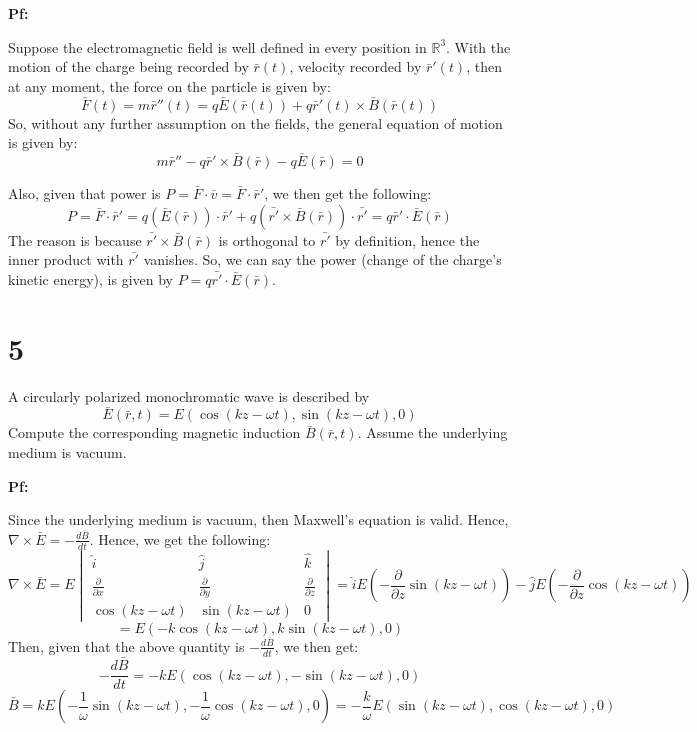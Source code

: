 \documentclass{article}
\begin{document}
\textbf{Pf:}

Suppose the electromagnetic field is well defined in every position in $\mathbb{R}^3$. With the motion of the charge being recorded by $\bar{r}(t)$,
velocity recorded by $\bar{r}'(t)$, then at any moment, the force on the particle is given by:
$$\bar{F}(t) = m\bar{r}''(t)=q\bar{E}(\bar{r}(t))+q\bar{r}'(t)\times \bar{B}(\bar{r}(t))$$
So, without any further assumption on the fields, the general equation of motion is given by:
$$m\bar{r}''-q\bar{r}'\times \bar{B}(\bar{r})-q\bar{E}(\bar{r}) = 0$$

\hfil

Also, given that power is $P=\bar{F}\cdot \bar{v} = \bar{F}\cdot \bar{r}'$, we then get the following:
$$P=\bar{F}\cdot \bar{r}' = q(\bar{E}(\bar{r}))\cdot \bar{r}' + q(\bar{r'}\times \bar{B}(\bar{r}))\cdot \bar{r'} = q\bar{r}'\cdot \bar{E}(\bar{r})$$
The reason is because $\bar{r'}\times \bar{B}(\bar{r})$ is orthogonal to $\bar{r'}$ by definition, hence the inner product with $\bar{r'}$ vanishes.
So, we can say the power (change of the charge's kinetic energy), is given by $P=q\bar{r'}\cdot \bar{E}(\bar{r})$.

\break

\section*{5}
\begin{myBox}[]{}
    A circularly polarized monochromatic wave is described by
    $$\bar{E}(\bar{r},t)=E(\cos(kz-\omega t),\sin(kz-\omega t),0)$$
    Compute the corresponding magnetic induction $\bar{B}(\bar{r},t)$. Assume the underlying medium is vacuum.
\end{myBox}

\textbf{Pf:}

Since the underlying medium is vacuum, then Maxwell's equation is valid. Hence, $\nabla\times \bar{E}=-\frac{d\bar{B}}{dt}$.
Hence, we get the following:
$$\nabla\times \bar{E} = E\begin{vmatrix}
    \hat{i}&\hat{j}&\hat{k}\\
    \frac{\partial}{\partial x} & \frac{\partial}{\partial y} & \frac{\partial}{\partial z}\\
    \cos(kz-\omega t)&\sin(kz-\omega t)&0
\end{vmatrix} = \hat{i}E\left(-\frac{\partial}{\partial z}\sin(kz-\omega t)\right) -\hat{j}E\left(-\frac{\partial}{\partial z}\cos(kz-\omega t)\right)$$
$$ = E(-k\cos(kz-\omega t),k\sin(kz-\omega t),0)$$
Then, given that the above quantity is $-\frac{d\bar{B}}{dt}$, we then get:
$$-\frac{d\bar{B}}{dt}=-kE(\cos(kz-\omega t),-\sin(kz-\omega t),0)$$
$$\bar{B} = kE\left(-\frac{1}{\omega}\sin(kz-\omega t),-\frac{1}{\omega}\cos(kz-\omega t),0\right) = -\frac{k}{\omega }E(\sin(kz-\omega t),\cos(kz-\omega t),0)$$
\end{document}
